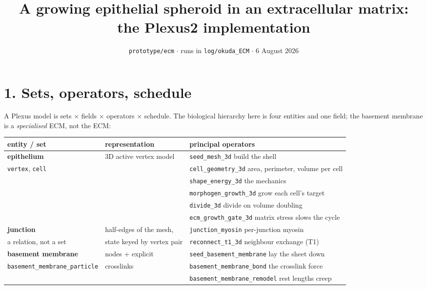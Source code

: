 \documentclass[10pt,a4paper]{article}
\title{\vspace{-1.4cm}\textbf{A growing epithelial spheroid in an extracellular matrix:\\
the Plexus2 implementation}}
\author{}
\date{\vspace{-0.9cm}\small \texttt{prototype/ecm} $\cdot$ runs in \texttt{log/okuda\_ECM} $\cdot$ 6 August 2026}
\newcommand{\op}[1]{\texttt{#1}}
\begin{document}
\maketitle\vspace{-1.1cm}

\section*{1.\; Sets, operators, schedule}

A Plexus model is sets $\times$ fields $\times$ operators $\times$ schedule. The biological hierarchy
here is four entities and one field; the basement membrane is a \emph{specialised} ECM, not the ECM:

\smallskip
{\small
\begin{tabular}{@{}lll@{}}
\toprule
entity / set & representation & principal operators\\
\midrule
\textbf{epithelium}          & 3D active vertex model  & \op{seed\_mesh\_3d} \quad build the shell\\
\op{vertex}, \op{cell}       &                         & \op{cell\_geometry\_3d} \quad area, perimeter, volume per cell\\
                             &                         & \op{shape\_energy\_3d} \quad the mechanics\\
                             &                         & \op{morphogen\_growth\_3d} \quad grow each cell's target\\
                             &                         & \op{divide\_3d} \quad divide on volume doubling\\
                             &                         & \op{ecm\_growth\_gate\_3d} \quad matrix stress slows the cycle \cite{helmlinger1997}\\
\midrule
\textbf{junction}            & half-edges of the mesh, & \op{junction\_myosin} \quad per-junction myosin\\
a relation, not a set        & state keyed by vertex pair & \op{reconnect\_t1\_3d} \quad neighbour exchange (T1)\\
\midrule
\textbf{basement membrane}   & nodes + explicit        & \op{seed\_basement\_membrane} \quad lay the sheet down\\
\op{basement\_membrane\_particle} & crosslinks         & \op{basement\_membrane\_bond} \quad the crosslink force\\
                             &                         & \op{basement\_membrane\_remodel} \quad rest lengths creep\\

\end{tabular}}
\end{document}
